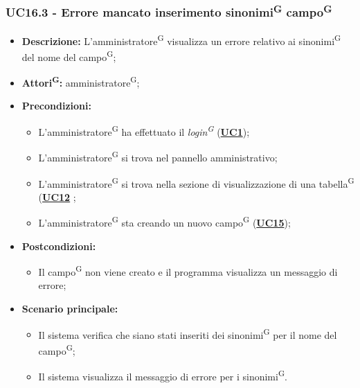 \subsubsection{UC16.3 - Errore mancato inserimento sinonimi\textsuperscript{G} campo\textsuperscript{G}}
\label{sec:UC16.3}
\begin{itemize}
	\item \textbf{Descrizione:} L’amministratore\textsuperscript{G} visualizza un errore relativo ai sinonimi\textsuperscript{G} del nome del campo\textsuperscript{G};
	\item \textbf{Attori\textsuperscript{G}:} amministratore\textsuperscript{G};
	\item \textbf{Precondizioni:} 
	\begin{itemize}
		\item L’amministratore\textsuperscript{G} ha effettuato il \textit{login\textsuperscript{G}} (\hyperref[sec:UC1]{\textbf{UC1}});
		\item L’amministratore\textsuperscript{G} si trova nel pannello amministrativo;
		\item L’amministratore\textsuperscript{G} si trova nella sezione di visualizzazione di una tabella\textsuperscript{G} (\hyperref[sec:UC12]{\textbf{UC12}} ;
		\item L’amministratore\textsuperscript{G} sta creando un nuovo campo\textsuperscript{G} (\hyperref[sec:UC15]{\textbf{UC15}});
	\end{itemize}
	\item \textbf{Postcondizioni:} 
	\begin{itemize}
		\item Il campo\textsuperscript{G} non viene creato e il programma visualizza un messaggio di errore;
	\end{itemize}
	\item \textbf{Scenario principale:} 
	\begin{itemize}
		\item Il sistema verifica che siano stati inseriti dei sinonimi\textsuperscript{G} per il nome del campo\textsuperscript{G};
		\item Il sistema visualizza il messaggio di errore per i sinonimi\textsuperscript{G}.
	\end{itemize}
\end{itemize}

